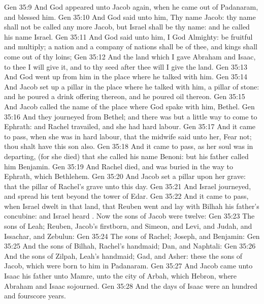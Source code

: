 \vs Gen 35:9 And God appeared unto Jacob again, when he came out of Padanaram, and blessed him.
\vs Gen 35:10 And God said unto him, Thy name  Jacob: thy name shall not be called any more Jacob, but Israel shall be thy name: and he called his name Israel.
\vs Gen 35:11 And God said unto him, I  God Almighty: be fruitful and multiply; a nation and a company of nations shall be of thee, and kings shall come out of thy loins;
\vs Gen 35:12 And the land which I gave Abraham and Isaac, to thee I will give it, and to thy seed after thee will I give the land.
\vs Gen 35:13 And God went up from him in the place where he talked with him.
\vs Gen 35:14 And Jacob set up a pillar in the place where he talked with him,  a pillar of stone: and he poured a drink offering thereon, and he poured oil thereon.
\vs Gen 35:15 And Jacob called the name of the place where God spake with him, Bethel.
\vs Gen 35:16 And they journeyed from Bethel; and there was but a little way to come to Ephrath: and Rachel travailed, and she had hard labour.
\vs Gen 35:17 And it came to pass, when she was in hard labour, that the midwife said unto her, Fear not; thou shalt have this son also.
\vs Gen 35:18 And it came to pass, as her soul was in departing, (for she died) that she called his name Benoni: but his father called him Benjamin.
\vs Gen 35:19 And Rachel died, and was buried in the way to Ephrath, which  Bethlehem.
\vs Gen 35:20 And Jacob set a pillar upon her grave: that  the pillar of Rachel's grave unto this day.
\vs Gen 35:21 And Israel journeyed, and spread his tent beyond the tower of Edar.
\vs Gen 35:22 And it came to pass, when Israel dwelt in that land, that Reuben went and lay with Bilhah his father's concubine: and Israel heard . Now the sons of Jacob were twelve:
\vs Gen 35:23 The sons of Leah; Reuben, Jacob's firstborn, and Simeon, and Levi, and Judah, and Issachar, and Zebulun:
\vs Gen 35:24 The sons of Rachel; Joseph, and Benjamin:
\vs Gen 35:25 And the sons of Bilhah, Rachel's handmaid; Dan, and Naphtali:
\vs Gen 35:26 And the sons of Zilpah, Leah's handmaid; Gad, and Asher: these  the sons of Jacob, which were born to him in Padanaram.
\vs Gen 35:27 And Jacob came unto Isaac his father unto Mamre, unto the city of Arbah, which  Hebron, where Abraham and Isaac sojourned.
\vs Gen 35:28 And the days of Isaac were an hundred and fourscore years.
